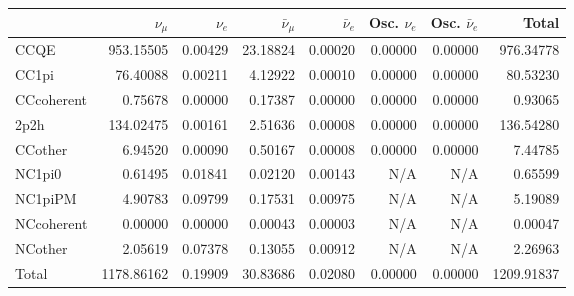 \begin{tabular} { | l ||r | r | r | r | r | r | | r | }
\hline
              & $\nu_\mu$            & $\nu_e$              & $\bar{\nu}_{\mu}$    & $\bar{\nu}_{e}$      & Osc. $\nu_e$         & Osc. $\bar{\nu}_{e}$ & Total                \\ \hline\hline
 CCQE         & 953.15505            & 0.00429              & 23.18824             & 0.00020              & 0.00000              & 0.00000              & 976.34778            \\ \hline
 CC1pi        & 76.40088             & 0.00211              & 4.12922              & 0.00010              & 0.00000              & 0.00000              & 80.53230             \\ \hline
 CCcoherent   & 0.75678              & 0.00000              & 0.17387              & 0.00000              & 0.00000              & 0.00000              & 0.93065              \\ \hline
 2p2h         & 134.02475            & 0.00161              & 2.51636              & 0.00008              & 0.00000              & 0.00000              & 136.54280            \\ \hline
 CCother      & 6.94520              & 0.00090              & 0.50167              & 0.00008              & 0.00000              & 0.00000              & 7.44785              \\ \hline
 NC1pi0       & 0.61495              & 0.01841              & 0.02120              & 0.00143              & N/A                  & N/A                  & 0.65599              \\ \hline
 NC1piPM      & 4.90783              & 0.09799              & 0.17531              & 0.00975              & N/A                  & N/A                  & 5.19089              \\ \hline
 NCcoherent   & 0.00000              & 0.00000              & 0.00043              & 0.00003              & N/A                  & N/A                  & 0.00047              \\ \hline
 NCother      & 2.05619              & 0.07378              & 0.13055              & 0.00912              & N/A                  & N/A                  & 2.26963              \\ \hline
\hline
 Total        & 1178.86162           & 0.19909              & 30.83686             & 0.02080              & 0.00000              & 0.00000              & 1209.91837           \\ \hline

\end{tabular}
